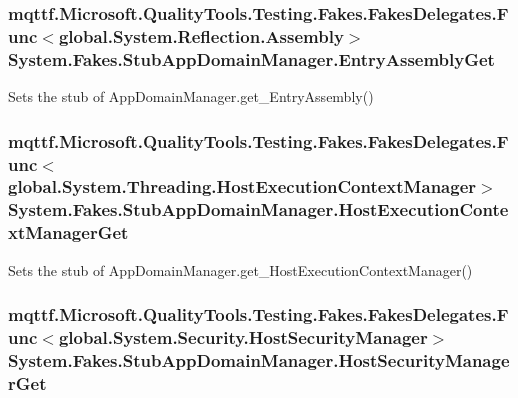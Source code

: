\hypertarget{class_system_1_1_fakes_1_1_stub_app_domain_manager_a72fedbb4e079b031ebc7c717385e2c2b}{
\subsubsection[{Entry\-Assembly\-Get}]{\setlength{\rightskip}{0pt plus 5cm}mqttf.\-Microsoft.\-Quality\-Tools.\-Testing.\-Fakes.\-Fakes\-Delegates.\-Func$<$global.\-System.\-Reflection.\-Assembly$>$ System.\-Fakes.\-Stub\-App\-Domain\-Manager.\-Entry\-Assembly\-Get}}\label{class_system_1_1_fakes_1_1_stub_app_domain_manager_a72fedbb4e079b031ebc7c717385e2c2b}


Sets the stub of App\-Domain\-Manager.\-get\-\_\-\-Entry\-Assembly()

\hypertarget{class_system_1_1_fakes_1_1_stub_app_domain_manager_a133c3c6500c653d19f1b640c3a8692f8}{
\subsubsection[{Host\-Execution\-Context\-Manager\-Get}]{\setlength{\rightskip}{0pt plus 5cm}mqttf.\-Microsoft.\-Quality\-Tools.\-Testing.\-Fakes.\-Fakes\-Delegates.\-Func$<$global.\-System.\-Threading.\-Host\-Execution\-Context\-Manager$>$ System.\-Fakes.\-Stub\-App\-Domain\-Manager.\-Host\-Execution\-Context\-Manager\-Get}}\label{class_system_1_1_fakes_1_1_stub_app_domain_manager_a133c3c6500c653d19f1b640c3a8692f8}


Sets the stub of App\-Domain\-Manager.\-get\-\_\-\-Host\-Execution\-Context\-Manager()

\hypertarget{class_system_1_1_fakes_1_1_stub_app_domain_manager_af29db4e09299ba8e07035148e88abd0f}{
\subsubsection[{Host\-Security\-Manager\-Get}]{\setlength{\rightskip}{0pt plus 5cm}mqttf.\-Microsoft.\-Quality\-Tools.\-Testing.\-Fakes.\-Fakes\-Delegates.\-Func$<$global.\-System.\-Security.\-Host\-Security\-Manager$>$ System.\-Fakes.\-Stub\-App\-Domain\-Manager.\-Host\-Security\-Manager\-Get}}\label{class_system_1_1_fakes_1_1_stub_app_domain_manager_af29db4e09299ba8e07035148e88abd0f}


